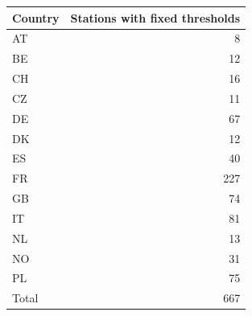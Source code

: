\begin{tabular}{@{}lr@{}}
\toprule
Country & Stations with fixed thresholds \\
\midrule
AT & 8 \\
BE & 12 \\
CH & 16 \\
CZ & 11 \\
DE & 67 \\
DK & 12 \\
ES & 40 \\
FR & 227 \\
GB & 74 \\
IT & 81 \\
NL & 13 \\
NO & 31 \\
PL & 75 \\
\midrule
Total & 667 \\
\bottomrule
\end{tabular}
